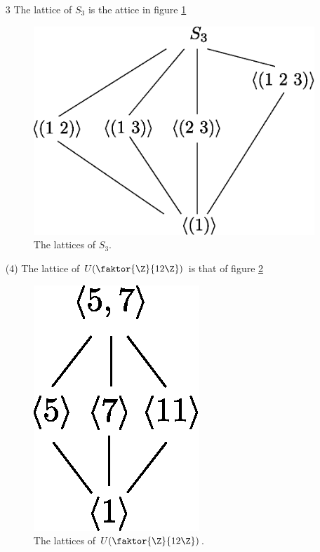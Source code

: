 \begin{example}
\begin{enumerate}
        \item[3] The lattice of $S_3$ is the attice in figure \ref{fig_2.3}
            \begin{figure}[h]
                \centering
                \includegraphics[scale = 0.5]{Figures/Chapter2/S_3_lattice.eps}
                \caption{The lattices of $S_3$.}
                \label{fig_2.3}
            \end{figure}

        \item[(4)] The lattice of $U(\faktor{\Z}{12\Z})$ is that of figure
            \ref{fig_2.4}
            \begin{figure}[h]
                \centering
                \includegraphics[scale = 0.8]{Figures/Chapter2/U(Z_12)_lattice.eps}
                \caption{The lattices of $U(\faktor{\Z}{12\Z})$.}
                \label{fig_2.4}
            \end{figure}


\end{enumerate}
\end{example}
